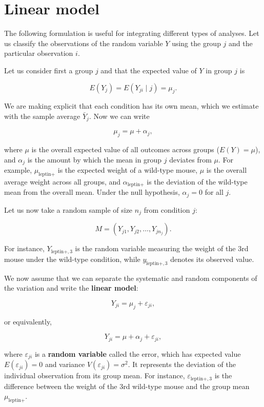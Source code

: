 \documentclass[
]{book}
\begin{document}
\hypertarget{linear-model}{%
\section{Linear model}\label{linear-model}}

The following formulation is useful for integrating different types of analyses. Let us classify the observations of the random variable \(Y\) using the group \(j\) and the particular observation \(i\).

Let us consider first a group \(j\) and that the expected value of \(Y\) in group \(j\) is

\[E(Y_j)=E(Y_{ji}\mid j)=\mu_j.\]

We are making explicit that each condition has its own mean, which we estimate with the sample average \(\bar{Y}_j\). Now we can write

\[\mu_j=\mu + \alpha_j,\]

where \(\mu\) is the overall expected value of all outcomes across groups (\(E(Y)=\mu\)), and \(\alpha_j\) is the amount by which the mean in group \(j\) deviates from \(\mu\). For example, \(\mu_{\text{leptin+}}\) is the expected weight of a wild-type mouse, \(\mu\) is the overall average weight across all groups, and \(\alpha_{\text{leptin+}}\) is the deviation of the wild-type mean from the overall mean. Under the null hypothesis, \(\alpha_j=0\) for all \(j\).

Let us now take a random sample of size \(n_j\) from condition \(j\):

\[M=(Y_{j1}, Y_{j2}, \ldots, Y_{jn_j}).\]

For instance, \(Y_{\text{leptin+},3}\) is the random variable measuring the weight of the 3rd mouse under the wild-type condition, while \(y_{\text{leptin+},3}\) denotes its observed value.

We now assume that we can separate the systematic and random components of the variation and write the \textbf{linear model}:

\[Y_{ji} = \mu_j + \varepsilon_{ji},\]

or equivalently,

\[Y_{ji} = \mu + \alpha_j + \varepsilon_{ji},\]

where \(\varepsilon_{ji}\) is a \textbf{random variable} called the error, which has expected value \(E(\varepsilon_{ji})=0\) and variance \(V(\varepsilon_{ji})=\sigma^2\). It represents the deviation of the individual observation from its group mean. For instance, \(\varepsilon_{\text{leptin+},3}\) is the difference between the weight of the 3rd wild-type mouse and the group mean \(\mu_{\text{leptin+}}\).
\end{document}
